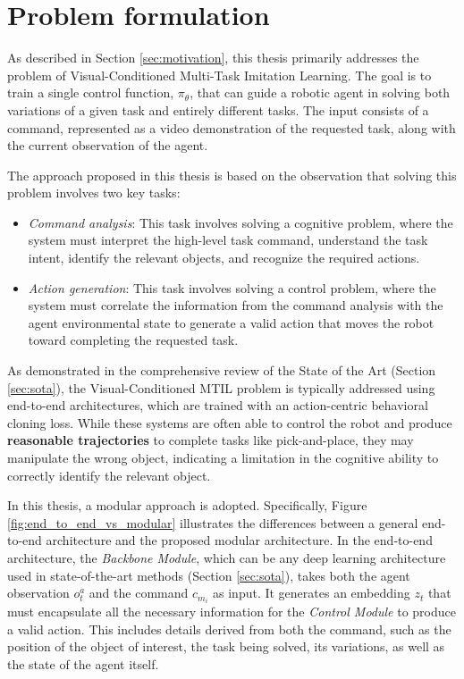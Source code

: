 \section{Problem formulation}
\label{sec:ocpl_problem}
As described in Section \ref{sec:motivation}, this thesis primarily addresses the problem of Visual-Conditioned Multi-Task Imitation Learning. The goal is to train a single control function, $\pi_{\theta}$, that can guide a robotic agent in solving both variations of a given task and entirely different tasks. The input consists of a command, represented as a video demonstration of the requested task, along with the current observation of the agent.

The approach proposed in this thesis is based on the observation that solving this problem involves two key tasks:
\begin{itemize}
    \item \textit{Command analysis}: This task involves solving a cognitive problem, where the system must interpret the high-level task command, understand the task intent, identify the relevant objects, and recognize the required actions.
    \item \textit{Action generation}: This task involves solving a control problem, where the system must correlate the information from the command analysis with the agent environmental state to generate a valid action that moves the robot toward completing the requested task.
\end{itemize}

As demonstrated in the comprehensive review of the State of the Art (Section \ref{sec:sota}), the Visual-Conditioned MTIL problem is typically addressed using end-to-end architectures, which are trained with an action-centric behavioral cloning loss. While these systems are often able to control the robot and produce \textbf{reasonable trajectories} to complete tasks like pick-and-place, they may manipulate the wrong object, indicating a limitation in the cognitive ability to correctly identify the relevant object.


In this thesis, a modular approach is adopted. Specifically, Figure \ref{fig:end_to_end_vs_modular} illustrates the differences between a general end-to-end architecture and the proposed modular architecture. In the end-to-end architecture, the \textit{Backbone Module}, which can be any deep learning architecture used in state-of-the-art methods (Section \ref{sec:sota}), takes both the agent observation $o^{a}_t$ and the command $c_{m_i}$ as input. It generates an embedding $z_t$ that must encapsulate all the necessary information for the \textit{Control Module} to produce a valid action. This includes details derived from both the command, such as the position of the object of interest, the task being solved, its variations, as well as the state of the agent itself.

